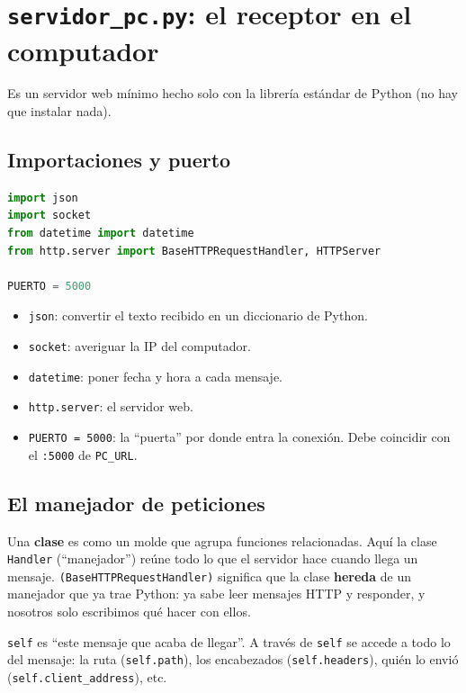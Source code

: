 \documentclass[11pt,a4paper]{article}
\begin{document}
\section{\texttt{servidor\_pc.py}: el receptor en el computador}

Es un servidor web mínimo hecho solo con la librería estándar de Python (no hay que
instalar nada).

\subsection{Importaciones y puerto}

\begin{lstlisting}[language=Python]
import json
import socket
from datetime import datetime
from http.server import BaseHTTPRequestHandler, HTTPServer

PUERTO = 5000
\end{lstlisting}

\begin{itemize}[leftmargin=*]
  \item \texttt{json}: convertir el texto recibido en un diccionario de Python.
  \item \texttt{socket}: averiguar la IP del computador.
  \item \texttt{datetime}: poner fecha y hora a cada mensaje.
  \item \texttt{http.server}: el servidor web.
  \item \texttt{PUERTO = 5000}: la ``puerta'' por donde entra la conexión. Debe
        coincidir con el \texttt{:5000} de \texttt{PC\_URL}.
\end{itemize}

\subsection{El manejador de peticiones}

\begin{idea}
Una \textbf{clase} es como un molde que agrupa funciones relacionadas. Aquí la
clase \texttt{Handler} (``manejador'') reúne todo lo que el servidor hace cuando
llega un mensaje. \texttt{(BaseHTTPRequestHandler)} significa que la clase
\textbf{hereda} de un manejador que ya trae Python: ya sabe leer mensajes HTTP y
responder, y nosotros solo escribimos qué hacer con ellos.

\texttt{self} es ``este mensaje que acaba de llegar''. A través de \texttt{self}
se accede a todo lo del mensaje: la ruta (\texttt{self.path}), los encabezados
(\texttt{self.headers}), quién lo envió (\texttt{self.client\_address}), etc.
\end{idea}
\end{document}
